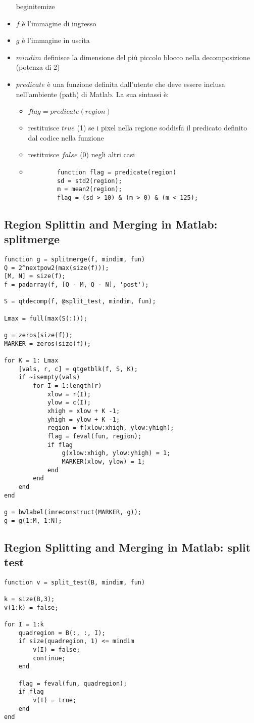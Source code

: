 \begin{itemize}
begin{itemize} 
\item $f$ è l'immagine di ingresso
\item $g$ è l'immagine in uscita
\item $mindim$ definisce la dimensione del più piccolo blocco nella decomposizione (potenza di 2)
\item $predicate$ è una funzione definita dall'utente che deve essere inclusa nell'ambiente (path) di Matlab. La sua sintassi è:
\begin{itemize}
	\item $flag = predicate(region)$
	\item restituisce $true$ (1) se i pixel nella regione soddisfa il predicato definito dal codice nella funzione
	\item restituisce $false$ (0) negli altri casi
	
	\item 
	\begin{lstlisting}
		function flag = predicate(region)
		sd = std2(region);
		m = mean2(region);
		flag = (sd > 10) & (m > 0) & (m < 125);
	\end{lstlisting}
\end{itemize}
\end{itemize}

\subsection{Region Splittin and Merging in Matlab: splitmerge}
\begin{lstlisting}
function g = splitmerge(f, mindim, fun)
Q = 2^nextpow2(max(size(f)));
[M, N] = size(f);
f = padarray(f, [Q - M, Q - N], 'post');

S = qtdecomp(f, @split_test, mindim, fun);

Lmax = full(max(S(:)));

g = zeros(size(f));
MARKER = zeros(size(f));

for K = 1: Lmax
	[vals, r, c] = qtgetblk(f, S, K);
	if ~isempty(vals)
		for I = 1:length(r)
			xlow = r(I);
			ylow = c(I);
			xhigh = xlow + K -1;
			yhigh = ylow + K -1;
			region = f(xlow:xhigh, ylow:yhigh);
			flag = feval(fun, region);
			if flag
				g(xlow:xhigh, ylow:yhigh) = 1;
				MARKER(xlow, ylow) = 1;
			end
		end
	end
end

g = bwlabel(imreconstruct(MARKER, g));
g = g(1:M, 1:N);
\end{lstlisting}

\subsection{Region Splitting and Merging in Matlab: split test}
\begin{lstlisting}
function v = split_test(B, mindim, fun)

k = size(B,3);
v(1:k) = false;

for I = 1:k
	quadregion = B(:, :, I);
	if size(quadregion, 1) <= mindim
		v(I) = false;
		continue;
	end
	
	flag = feval(fun, quadregion);
	if flag
		v(I) = true;
	end
end
\end{lstlisting}
